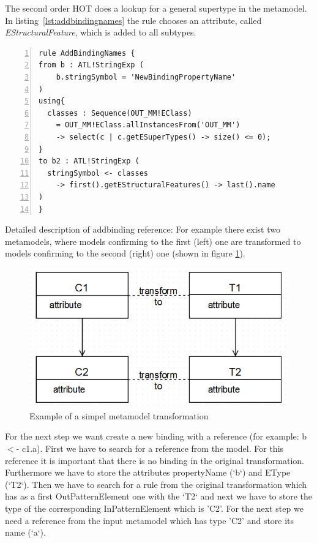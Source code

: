\documentclass{llncs}
\begin{document}
The second order HOT does a lookup for a general supertype in the metamodel. In listing~\ref{lst:addbindingnames} the rule chooses an attribute, called \emph{EStructuralFeature}, which is added to all subtypes.

\begin{lstlisting}[language=ATL, numbers=left,xleftmargin=5.0ex, caption=AddBindingNames-Definition., label=lst:addbindingnames]
rule AddBindingNames {
from b : ATL!StringExp (
    b.stringSymbol = 'NewBindingPropertyName'
)
using{
  classes : Sequence(OUT_MM!EClass) 
	= OUT_MM!EClass.allInstancesFrom('OUT_MM') 
	-> select(c | c.getESuperTypes() -> size() <= 0);
}
to b2 : ATL!StringExp ( 
  stringSymbol <- classes 
	-> first().getEStructuralFeatures() -> last().name
)	
}
\end{lstlisting}

Detailed description of addbinding reference:
For example there exist two metamodels, where models confirming to the first (left) one are transformed to models confirming to the second (right) one (shown in figure
\ref{fig:simple_metamodel}).

\begin{figure}
	\centering
	\includegraphics[angle=0,width=1\textwidth,natwidth=610,natheight=642]{figures/klassendiagramm.PNG}
	\caption{Example of a simpel metamodel transformation}
	\label{fig:simple_metamodel}
\end{figure}

For the next step we want create a new binding with a reference (for example: b $<$- c1.a).
First we have to search for a reference from the model. For this reference it is
important that there is no binding in the original transformation. Furthermore
we have to store the attributes propertyName (`b`) and EType (`T2`). 
Then we have to search for a rule from the original transformation which
has as a first OutPatternElement one with the `T2` and next we have to store the type of the corresponding InPatternElement which is 'C2'.
For the next step we need a reference from the input metamodel which
has type 'C2' and store its name (`a`). \par
\end{document}
